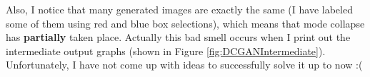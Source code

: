 \documentclass{article} %
\begin{document}
Also, I notice that many generated images are exactly the same (I have labeled some of them using red and blue box selections), which means that mode collapse has \textbf{partially} taken place. Actually this bad smell occurs when I print out the intermediate output graphs (shown in Figure \ref{fig:DCGANIntermediate}). Unfortunately, I have not come up with ideas to successfully solve it up to now :(

\begin{figure}[htbp]
\centering
{}%
%
\centering
\end{figure}
\end{document}
